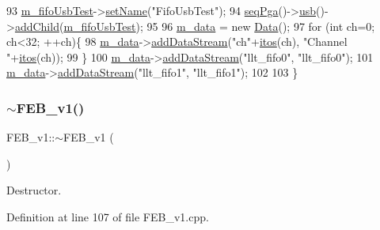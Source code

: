 \begin{DoxyCode}
93   \hyperlink{classFEB__v1_a5850ce498462009212ad3f313fcf0bd6}{m\_fifoUsbTest}->\hyperlink{classObject_ae30fea75683c2d149b6b6d17c09ecd0c}{setName}(\textcolor{stringliteral}{"FifoUsbTest"});
94   \hyperlink{classFEB__v1_a8bf655504f9b0c51d5aa5bc6b30da00d}{seqPga}()->\hyperlink{classSeqPGA_a10c68ea9de38eb0445d47e4b21b580a1}{usb}()->\hyperlink{classHierarchy_ad677774ff38fcb257c04a3a10d471fac}{addChild}(\hyperlink{classFEB__v1_a5850ce498462009212ad3f313fcf0bd6}{m\_fifoUsbTest});
95 
96   \hyperlink{classFEB__v1_a1c9dbc3660021dba1f58666d0097abb0}{m\_data} = \textcolor{keyword}{new} \hyperlink{classData}{Data}();
97   \textcolor{keywordflow}{for} (\textcolor{keywordtype}{int} ch=0; ch<32; ++ch)\{
98     \hyperlink{classFEB__v1_a1c9dbc3660021dba1f58666d0097abb0}{m\_data}->\hyperlink{classData_a33c31859f6b2771ebd4f0b83fa44739c}{addDataStream}(\textcolor{stringliteral}{"ch"}+\hyperlink{Tools_8h_af330027dbdafb9a30768b3613c553e60}{itos}(ch), \textcolor{stringliteral}{"Channel "}+\hyperlink{Tools_8h_af330027dbdafb9a30768b3613c553e60}{itos}(ch));
99   \}
100   \hyperlink{classFEB__v1_a1c9dbc3660021dba1f58666d0097abb0}{m\_data}->\hyperlink{classData_a33c31859f6b2771ebd4f0b83fa44739c}{addDataStream}(\textcolor{stringliteral}{"llt\_fifo0"}, \textcolor{stringliteral}{"llt\_fifo0"});
101   \hyperlink{classFEB__v1_a1c9dbc3660021dba1f58666d0097abb0}{m\_data}->\hyperlink{classData_a33c31859f6b2771ebd4f0b83fa44739c}{addDataStream}(\textcolor{stringliteral}{"llt\_fifo1"}, \textcolor{stringliteral}{"llt\_fifo1"});
102   
103 \}
\end{DoxyCode}
\mbox{\label{classFEB__v1_a655c6fb31068c4dbb7fde34de77a5a49}} 
\subsubsection{\texorpdfstring{$\sim$\+F\+E\+B\+\_\+v1()}{~FEB\_v1()}}
{\footnotesize\ttfamily F\+E\+B\+\_\+v1\+::$\sim$\+F\+E\+B\+\_\+v1 (\begin{DoxyParamCaption}{ }\end{DoxyParamCaption})\hspace{0.3cm}{\ttfamily [virtual]}}



Destructor. 



Definition at line 107 of file F\+E\+B\+\_\+v1.\+cpp.


